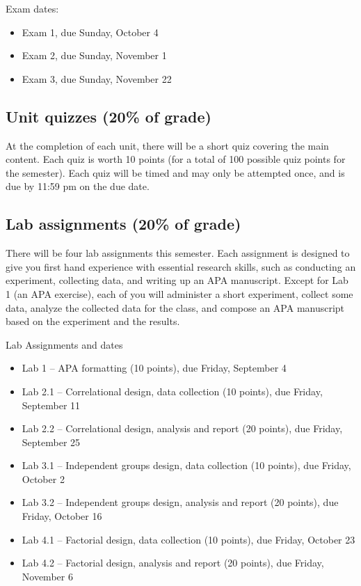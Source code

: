 \documentclass[10pt]{article}
\begin{document}
Exam dates:

\begin{itemize}
\item Exam 1, due Sunday, October 4
\item Exam 2, due Sunday, November 1
\item Exam 3, due Sunday, November 22
\end{itemize}

\subsection*{Unit quizzes (20\% of grade)}
\label{sec:org38763b0}

At the completion of each unit, there will be a short quiz covering the main content.  Each quiz is worth 10 points (for a total of 100 possible quiz points for the semester).  Each quiz will be timed and may only be attempted once, and is due by 11:59 pm on the due date.

\subsection*{Lab assignments (20\% of grade)}
\label{sec:org4147b0e}

There will be four lab assignments this semester.  Each assignment is designed to give you first hand experience with essential research skills, such as conducting an experiment, collecting data, and writing up an APA manuscript.  Except for Lab 1 (an APA exercise), each of you will administer a short experiment, collect some data, analyze the collected data for the class, and compose an APA manuscript based on the experiment and the results. 

Lab Assignments and dates

\begin{itemize}
\item Lab 1 – APA formatting (10 points), due Friday, September 4
\item Lab 2.1 – Correlational design, data collection (10 points), due Friday, September 11
\item Lab 2.2 – Correlational design, analysis and report (20 points), due Friday, September 25
\item Lab 3.1 – Independent groups design, data collection (10 points), due Friday, October 2
\item Lab 3.2 – Independent groups design, analysis and report (20 points), due Friday, October 16
\item Lab 4.1 – Factorial design, data collection (10 points), due Friday, October 23
\item Lab 4.2 – Factorial design, analysis and report (20 points), due Friday, November 6
\end{itemize}
\end{document}
